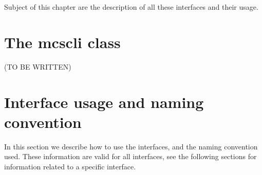 \documentclass[12pt,titlepage]{book}
\newcommand{\mcs}{\textbf{MCS} }
\begin{document}
\noindent Subject of this chapter are the description of all these interfaces
and their usage.


\section{The mcscli class}
(TO BE WRITTEN)


%
%
%
%							
%							
%
%
%
%


\section{Interface usage and naming convention}
In this section we describe how to use the interfaces, and the naming
convention used. These information are valid for all interfaces, see the
following sections for information related to a specific interface.
\end{document}
